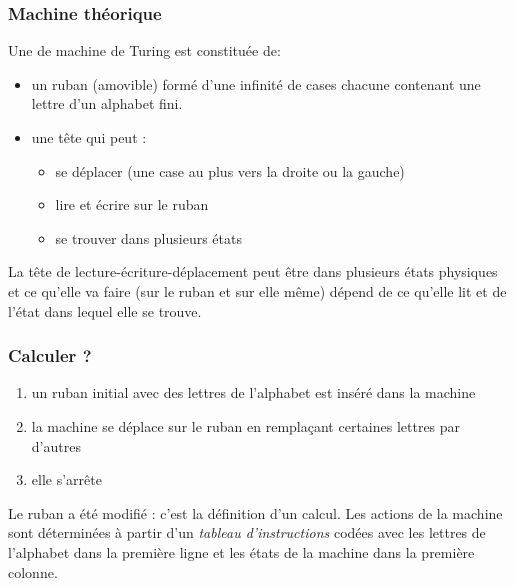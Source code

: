 


\begin{frame}
\frametitle{Machine théorique}
Une de machine de Turing est constituée de:
\begin{itemize}
  \item un ruban (amovible) formé d'une infinité de cases chacune contenant une lettre d'un alphabet fini.
  \item une tête qui peut :
  \begin{itemize}
    \item se déplacer (une case au plus vers la droite ou la gauche)
    \item lire et écrire sur le ruban
    \item se trouver dans plusieurs états
  \end{itemize}
\end{itemize}
La tête de lecture-écriture-déplacement peut être dans plusieurs états physiques et ce qu'elle va faire (sur le ruban et sur elle même) dépend de ce qu'elle lit et de l'état dans lequel elle se trouve. 
\end{frame}

\begin{frame}
  \frametitle{Calculer ?}
\begin{enumerate}
  \item un ruban initial avec des lettres de l'alphabet est inséré dans la machine
  \item la machine se déplace sur le ruban en remplaçant certaines lettres par d'autres
  \item elle s'arrête
\end{enumerate}
Le ruban a été modifié : c'est la définition d'un \og calcul\fg. \newline
Les actions de la machine sont déterminées à partir d'un \emph{tableau d'instructions} codées avec les lettres de l'alphabet dans la première ligne et les états de la machine dans la première colonne.
\end{frame}

